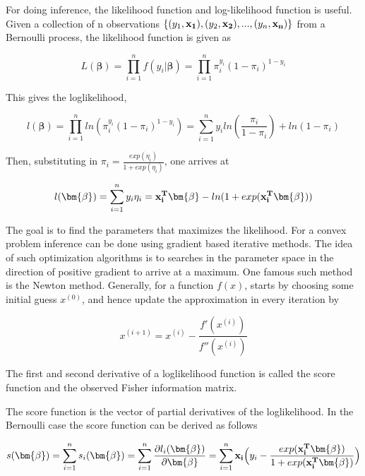 For doing inference, the likelihood function and log-likelihood function is useful. Given a collection of n observations $\{(y_1, {\bf x_1}), (y_2, {\bf x_2}),...,(y_n, {\bf x_n})\}$ from a Bernoulli process, the likelihood function is given as

\begin{equation}
    L(\bm{\beta}) = \prod_{i=1}^{n} f(y_i |\bm{ \beta}) = \prod_{i=1}^{n} \pi_i^{y_i}(1-\pi_i)^{1-y_i}
\end{equation}

This gives the loglikelihood,

\begin{equation}
    l(\bm{\beta}) = \prod_{i=1}^{n} ln(\pi_i^{y_i}(1-\pi_i)^{1-y_i})  = \sum_{i=1}^{n} y_i ln(\frac{\pi_i}{1-\pi_i}) + ln(1-\pi_i)
\end{equation}

Then, substituting in $\pi_i = \frac{exp(\eta_i)}{1+exp(\eta_i)}$, one arrives at

\begin{equation}
    l(\bm{\beta}) = \sum_{i=1}^{n} y_i \eta_i = {\bf x_i^T} \bm{ \beta} - ln(1 + exp(\bf x_i^T \bm{ \beta}))
\end{equation}

The goal is to find the parameters that maximizes the likelihood. For a convex problem inference can be done using gradient based iterative methods. The idea of such optimization algorithms is to searches in the parameter space in the direction of positive gradient to arrive at a maximum. One famous such method is the Newton method. Generally, for a function $f(x)$, starts by choosing some initial guess $x^{(0)}$, and hence update the approximation in every iteration by

\begin{equation}
    x^{(i+1)} = x^{(i)} - \frac{f'(x^{(i)})}{f''(x^{(i)})}
\end{equation}

The first and second derivative of a loglikelihood function is called the score function and the observed Fisher information matrix.

The score function is the vector of partial derivatives of the loglikelihood. In the Bernoulli case the score function can be derived as follows

\begin{equation}
s(\bm{\beta}) = \sum_{i=1}^{n}s_i(\bm{\beta}) = \sum_{i=1}^{n} \frac{\partial l_i(\bm{\beta})}{\partial \bm{\beta}} = \sum_{i=1}^{n} {\bf x_i} \Big ( y_i - \frac{exp({\bf x_i^T} \bm{ \beta})}{1 + exp({\bf x_i^T} \bm{ \beta})}\Big )
\end{equation}


